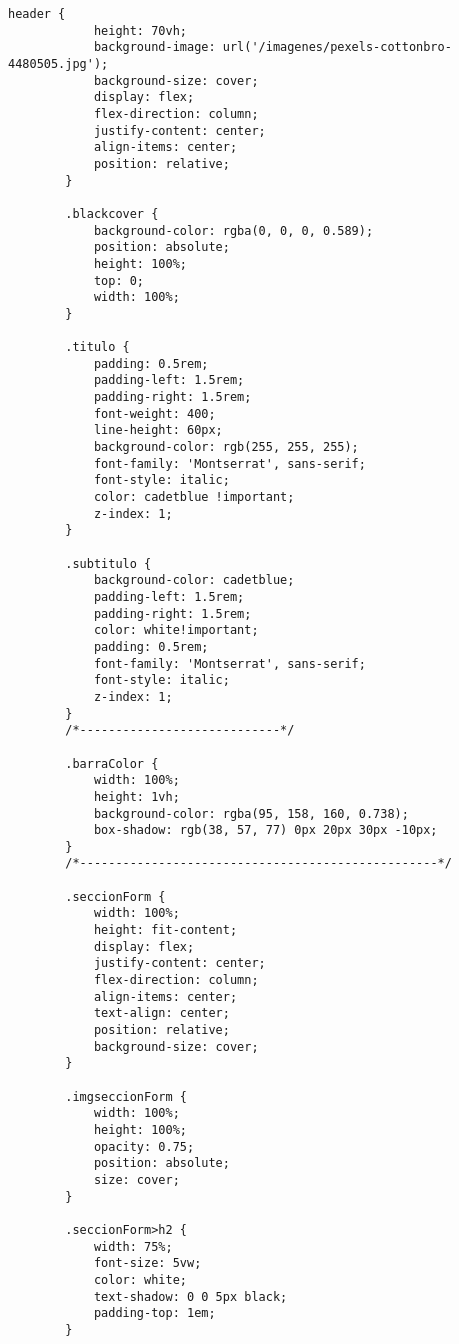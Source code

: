 \clearpage
\begin{lstlisting}[caption=location.css (LMSI)]
    header {
            height: 70vh;
            background-image: url('/imagenes/pexels-cottonbro-4480505.jpg');
            background-size: cover;
            display: flex;
            flex-direction: column;
            justify-content: center;
            align-items: center;
            position: relative;
        }

        .blackcover {
            background-color: rgba(0, 0, 0, 0.589);
            position: absolute;
            height: 100%;
            top: 0;
            width: 100%;
        }

        .titulo {
            padding: 0.5rem;
            padding-left: 1.5rem;
            padding-right: 1.5rem;
            font-weight: 400;
            line-height: 60px;
            background-color: rgb(255, 255, 255);
            font-family: 'Montserrat', sans-serif;
            font-style: italic;
            color: cadetblue !important;
            z-index: 1;
        }

        .subtitulo {
            background-color: cadetblue;
            padding-left: 1.5rem;
            padding-right: 1.5rem;
            color: white!important;
            padding: 0.5rem;
            font-family: 'Montserrat', sans-serif;
            font-style: italic;
            z-index: 1;
        }
        /*----------------------------*/

        .barraColor {
            width: 100%;
            height: 1vh;
            background-color: rgba(95, 158, 160, 0.738);
            box-shadow: rgb(38, 57, 77) 0px 20px 30px -10px;
        }
        /*--------------------------------------------------*/

        .seccionForm {
            width: 100%;
            height: fit-content;
            display: flex;
            justify-content: center;
            flex-direction: column;
            align-items: center;
            text-align: center;
            position: relative;
            background-size: cover;
        }

        .imgseccionForm {
            width: 100%;
            height: 100%;
            opacity: 0.75;
            position: absolute;
            size: cover;
        }

        .seccionForm>h2 {
            width: 75%;
            font-size: 5vw;
            color: white;
            text-shadow: 0 0 5px black;
            padding-top: 1em;
        }


\end{lstlisting}
